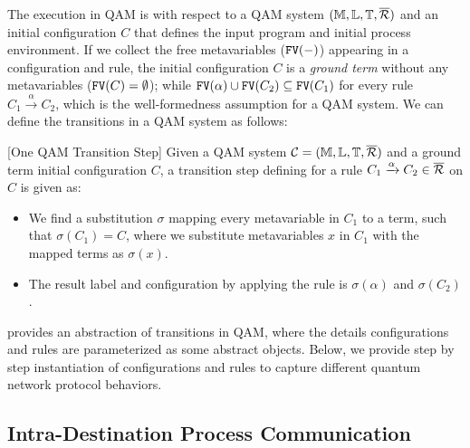 The execution in QAM is with respect to a QAM system $(\mathbb{M},\mathbb{L},\mathbb{T},\overline{\mathcal{R}})$ and an initial configuration $C$ that defines the input program and initial process environment.
If we collect the free metavariables ($\texttt{FV}(-)$) appearing in a configuration and rule, 
the initial configuration $C$ is a \textit{ground term} without any metavariables ($\texttt{FV}(C)=\emptyset$);
while $\texttt{FV}(\alpha) \cup \texttt{FV}(C_2)\subseteq \texttt{FV}(C_1)$ for every rule $C_1 \xrightarrow{\alpha} C_2$, which is the well-formedness assumption for a QAM system.
We can define the transitions in a QAM system as follows:

\begin{definition}\label{def:labeledsystem}\rm[One QAM Transition Step]
Given a QAM system $\mathcal{C}=(\mathbb{M},\mathbb{L},\mathbb{T},\overline{\mathcal{R}})$ and a ground term initial configuration $C$, a transition step defining for a rule $C_1 \xrightarrow{\alpha} C_2 \in \overline{\mathcal{R}}$ on $C$ is given as:
\begin{itemize}
\item We find a substitution $\sigma$ mapping every metavariable in $C_1$ to a term, such that $\sigma(C_1)=C$, where we substitute metavariables $x$ in $C_1$ with the mapped terms as $\sigma(x)$.
\item The result label and configuration by applying the rule is $\sigma(\alpha)$ and $\sigma(C_2)$.
\end{itemize}
\end{definition}

 provides an abstraction of transitions in QAM, where the details configurations and rules are parameterized as some abstract objects. Below, we provide step by step instantiation of configurations and rules to capture different quantum network protocol behaviors. 

\subsection{Intra-Destination Process Communication} \label{sec:qamsyntax}


